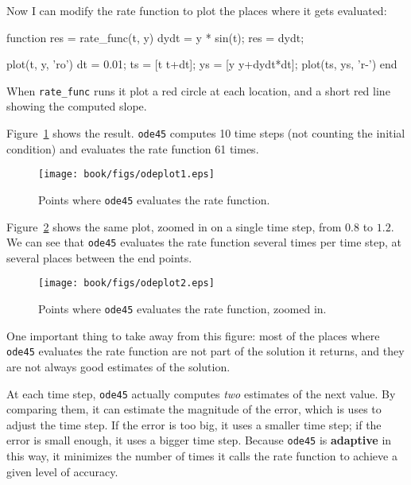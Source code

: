 \documentclass[main.tex]{subfiles}
\begin{document}

Now I can modify the rate function to plot the places where it gets evaluated:

\begin{code}
function res = rate_func(t, y)
    dydt = y * sin(t);
    res = dydt;

    plot(t, y, 'ro')
    dt = 0.01;
    ts = [t t+dt];
    ys = [y y+dydt*dt];
    plot(ts, ys, 'r-')
end
\end{code}

When \verb"rate_func" runs it plot a red circle at each location, and a short red line showing the computed slope.


Figure~\ref{fig:odeplot1} shows the result.  {\tt ode45} computes 10 time steps (not counting the initial condition) and evaluates the rate function 61 times.

\begin{figure}
\centerline{\texttt{[image: book/figs/odeplot1.eps]}}
\caption{Points where {\tt ode45} evaluates the rate function.}
\label{fig:odeplot1}
\end{figure}

Figure~\ref{fig:odeplot2} shows the same plot, zoomed in on a single time step, from $0.8$ to $1.2$.  We can see that {\tt ode45} evaluates the rate function several times per time step, at several places between the end points.  

\begin{figure}
\centerline{\texttt{[image: book/figs/odeplot2.eps]}}
\caption{Points where {\tt ode45} evaluates the rate function, zoomed in.}
\label{fig:odeplot2}
\end{figure}

One important thing to take away from this figure: most of the places where {\tt ode45} evaluates the rate function are not part of the solution it returns, and they are not always good estimates of the solution.

At each time step, {\tt ode45} actually computes {\em two} estimates of the next value.  By comparing them, it can estimate the magnitude of the error, which is uses to adjust the time step.  If the error is too big, it uses a smaller time step; if the error is small enough, it uses a bigger time step.  Because {\tt ode45} is {\bf adaptive} in this way, it minimizes the number of times it calls the rate function to achieve a given level of accuracy.

\end{document}
